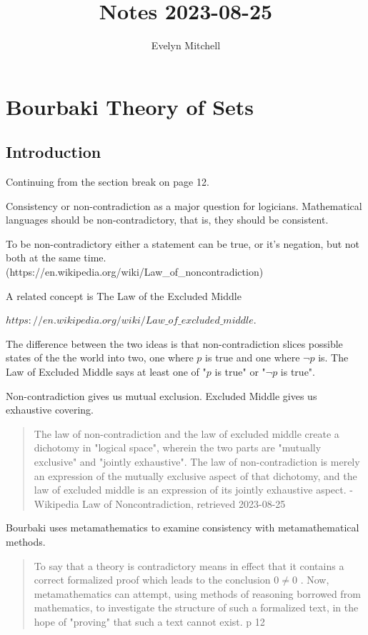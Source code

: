 \documentclass[]{scrartcl}
\title{Notes 2023-08-25}
\author{Evelyn Mitchell}
\begin{document}
\maketitle

\begin{abstract}

\end{abstract}

\section{Bourbaki Theory of Sets}

\subsection{Introduction}

Continuing from the section break on page 12.

Consistency or non-contradiction as a major question for logicians. Mathematical languages should be non-contradictory, that is, they should be consistent. 

To be non-contradictory either a statement can be true, or it's negation, but not both at the same time. (https://en.wikipedia.org/wiki/Law\_of\_noncontradiction) 

A related concept is The Law of the Excluded Middle

 \(https://en.wikipedia.org/wiki/Law\_of\_excluded\_middle\).

The difference between the two ideas is that non-contradiction slices possible states of the the world into two, one where $p$ is true and one where $\neg p$ is. The Law of Excluded Middle says at least one of "$p$ is true" or "$\neg p$ is true". 

Non-contradiction gives us mutual exclusion. Excluded Middle gives us exhaustive covering.


\begin{quote}
	The law of non-contradiction and the law of excluded middle create a dichotomy in "logical space", wherein the two parts are "mutually exclusive" and "jointly exhaustive". The law of non-contradiction is merely an expression of the mutually exclusive aspect of that dichotomy, and the law of excluded middle is an expression of its jointly exhaustive aspect. - Wikipedia Law of Noncontradiction, retrieved 2023-08-25
	\end{quote}

Bourbaki uses metamathematics to examine consistency with metamathematical methods. 

\begin{quote}
	To say that a theory is contradictory means in effect that it contains a correct formalized proof which leads to the conclusion $0 \ne 0$ . Now, metamathematics can attempt, using methods of reasoning borrowed from mathematics, to investigate the structure of such a formalized text, in the hope of "proving" that such a text cannot exist. p 12
\end{quote}
\end{document}
